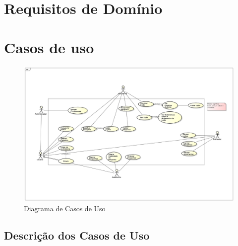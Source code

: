 \section{Requisitos de Domínio}


\section{Casos de uso}

\begin{figure}[H]
\centering
\includegraphics[width=18cm]{figuras/figura_casos_de_uso}
\caption{Diagrama de Casos de Uso}
\label{figura_casos_de_uso}
\end{figure}

\subsection{Descri\c{c}\~ao dos Casos de Uso}

